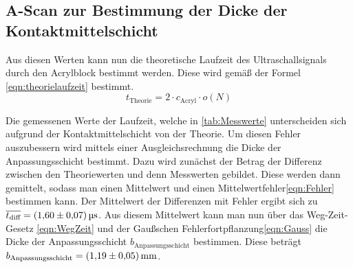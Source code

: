 \subsection{A-Scan zur Bestimmung der Dicke der Kontaktmittelschicht}
\label{subsec:ascankontakt}
Aus diesen Werten kann nun die theoretische Laufzeit des Ultraschallsignals durch den Acrylblock bestimmt werden. Diese wird gemäß der Formel \eqref{eqn:theorielaufzeit} bestimmt.
\begin{equation}
  \label{eqn:theorielaufzeit}
  t_{\text{Theorie}} = 2 \cdot c_{\text{Acryl}} \cdot o(N)
\end{equation}

Die gemessenen Werte der Laufzeit, welche in \autoref{tab:Messwerte} unterscheiden sich aufgrund der Kontaktmittelschicht von der Theorie. Um diesen Fehler auszubessern wird mittels einer Ausgleichsrechnung die Dicke
der Anpassungsschicht bestimmt. Dazu wird zunächst der Betrag der Differenz zwischen den Theoriewerten und denn Messwerten gebildet. Diese werden dann gemittelt, sodass man einen Mittelwert
und einen Mittelwertfehler\eqref{eqn:Fehler} bestimmen kann. Der Mittelwert der Differenzen mit Fehler ergibt sich zu $\overline{t_{\text{diff}}} = \qty{1.60+-0.07}{\micro\second}$.
Aus diesem Mittelwert kann man nun über das Weg-Zeit-Gesetz \eqref{eqn:WegZeit} und der Gaußschen Fehlerfortpflanzung\eqref{eqn:Gauss} die Dicke der Anpassungsschicht $b_{\text{Anpassungsschicht}}$ bestimmen.
Diese beträgt $b_{\text{Anpassungsschicht}} = \qty{1.19+-0.05}{\milli\metre}$.
